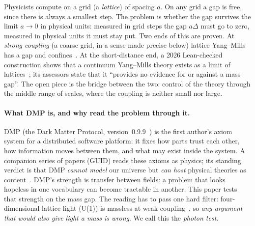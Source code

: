 \documentclass[11pt,a4paper]{article}
\begin{document}
Physicists compute on a grid (a \emph{lattice}) of spacing $a$. On any grid a gap is free, since there is always a smallest step. The
problem is whether the gap survives the limit $a\to0$ in physical units: measured in grid steps the gap $a\Delta$ must go to zero, measured
in physical units it must stay put. Two ends of this are proven. At \emph{strong coupling} (a coarse grid, in a sense made precise below)
lattice Yang--Mills has a gap and confines~\cite{os78,szz,lgt}. At the short-distance end, a 2026 Lean-checked construction shows that a
continuum Yang--Mills theory exists as a limit of lattices~\cite{openai2026}; its assessors state that it ``provides no evidence for or
against a mass gap''. The open piece is the bridge between the two: control of the theory through the middle range of scales, where the
coupling is neither small nor large.

\paragraph{What DMP is, and why read the problem through it.} DMP (the Dark Matter Protocol, version~0.9.9~\cite{dmp}) is the first author's
axiom system for a distributed software platform: it fixes how parts trust each other, how information moves between them, and what may
exist inside the system. A companion series of papers (GUID) reads these axioms as physics; its standing verdict is that DMP \emph{cannot
model} our universe but \emph{can host} physical theories as content~\cite{guidv7}. DMP's strength is transfer between fields: a problem
that looks hopeless in one vocabulary can become tractable in another. This paper tests that strength on the mass gap. The reading has to
pass one hard filter: four-dimensional lattice light (U(1)) is massless at weak coupling~\cite{guth,fs82}, so \emph{any argument that would
also give light a mass is wrong}. We call this the \emph{photon test}.
\end{document}
